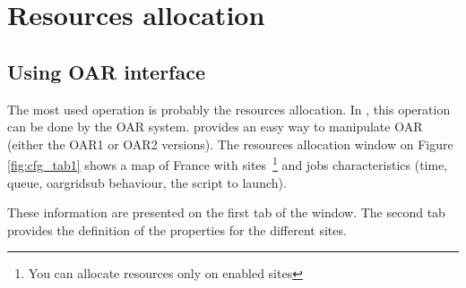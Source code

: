 \chapter{Resources allocation}

\section{Using OAR interface}
\label{sec:oar}

The most used operation is probably the resources allocation. In \gfk,
this operation can be done by the OAR system. \grudu provides an easy way
to manipulate OAR (either the OAR1 or OAR2 versions). The resources allocation window on
Figure \ref{fig:cfg_tab1} shows a map of France with \gfk sites~\footnote{You
can allocate resources only on enabled sites} and jobs characteristics (time,
queue, oargridsub behaviour, the script to launch). 

These information are presented on the first tab of the
window. The second tab provides the definition of the properties for the
different sites.

